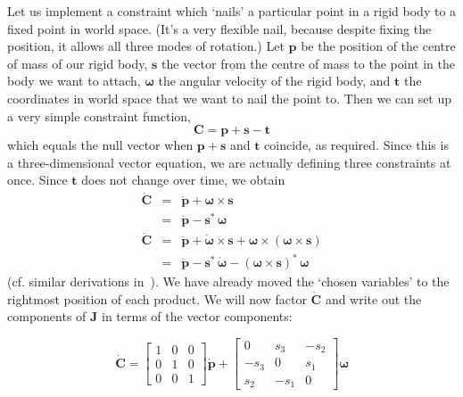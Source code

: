 Let us implement a constraint which `nails' a particular point in a rigid body to a fixed point
in world space. (It's a very flexible nail, because despite fixing the position, it allows all
three modes of rotation.) Let $\mathbf{p}$ be the position of the centre of mass of our rigid
body, $\mathbf{s}$ the vector from the centre of mass to the point in the body we want to attach,
$\bm{\omega}$ the angular velocity of the rigid body, and $\mathbf{t}$ the coordinates in world
space that we want to nail the point to. Then we can set up a very simple constraint function,
\begin{equation}
\mathbf{C} = \mathbf{p} + \mathbf{s} - \mathbf{t}
\end{equation}
which equals the null vector when $\mathbf{p}+\mathbf{s}$ and $\mathbf{t}$ coincide, as required.
Since this is a three-dimensional vector equation, we are actually defining three constraints
at once. Since $\mathbf{t}$ does not change over time, we obtain
\begin{eqnarray}
\dot{\mathbf{C}} &=& \dot{\mathbf{p}} + \bm{\omega}\times\mathbf{s} \nonumber\\
&=& \dot{\mathbf{p}} - \mathbf{s}^*\,\bm{\omega} \\
\ddot{\mathbf{C}} &=& \ddot{\mathbf{p}} + \dot{\bm{\omega}}\times\mathbf{s} +
    \bm{\omega}\times(\bm{\omega}\times\mathbf{s}) \nonumber\\
&=& \ddot{\mathbf{p}} - \mathbf{s}^*\,\dot{\bm{\omega}} -
    (\bm{\omega}\times\mathbf{s})^*\,\bm{\omega}
\end{eqnarray}
(cf. similar derivations in~\cite{Kalra:95}). We have already moved the `chosen variables' to
the rightmost position of each product. We will now factor $\dot{\mathbf{C}}$ and write out the
components of $\mathbf{J}$ in terms of the vector components:

\begin{equation}
\label{constrEx1J}
\dot{\mathbf{C}} = \left[\begin{array}{ccc} 1&0&0\\0&1&0\\0&0&1 \end{array}\right]
    \dot{\mathbf{p}} + \left[\begin{array}{ccc}
    0 & s_3 & -s_2 \\ -s_3 & 0 & s_1 \\ s_2 & -s_1 & 0
    \end{array}\right] \bm{\omega}
\end{equation}

